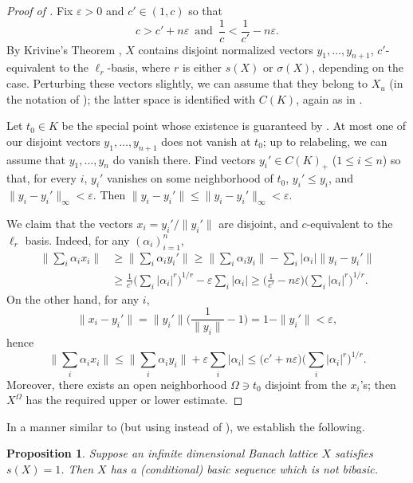 \documentclass[12pt,leqno]{amsart}
\newtheorem{proposition}[theorem]{Proposition}
\numberwithin{equation}{section}
\theoremstyle{definition}
\def\vp{\varepsilon}
\begin{document}
\begin{proof}[Proof of ]
Fix $\vp > 0$ and $c' \in (1,c)$ so that
$$
c > c' + n \vp \, {\textrm{  and  }} \, \frac1c < \frac1{c'} - n \vp .
$$
By Krivine's Theorem \cite{Schep}, $X$ contains disjoint normalized vectors $y_1, \ldots, y_{n+1}$, $c'$-equivalent to the $\ell_r$-basis, where $r$ is either $s(X)$ or $\sigma(X)$, depending on the case.
Perturbing these vectors slightly, we can assume that they belong to $X_u$ (in the notation of ); the latter space is identified with $C(K)$, again as in .
\medskip

Let $t_0 \in K$ be the special point whose existence is guaranteed by . At most one of our disjoint vectors $y_1, \ldots, y_{n+1}$ does not vanish at $t_0$; up to relabeling, we can assume that $y_1, \ldots, y_n$ do vanish there.
Find vectors $y_i' \in C(K)_+$ ($1 \leq i \leq n$) so that, for every $i$, $y_i'$ vanishes on some neighborhood of $t_0$, $y_i' \leq y_i$, and $\|y_i - y_i'\|_\infty < \vp$. Then $\|y_i - y_i'\| \leq \|y_i - y_i'\|_\infty < \vp$. 
\medskip

We claim that the vectors $x_i = y_i'/\|y_i'\|$ are disjoint, and $c$-equivalent to the $\ell_r$ basis. Indeed, for any $(\alpha_i)_{i=1}^n$,
\begin{align*}
\big\| \sum_i \alpha_i x_i \big\| 
&
\geq \big\| \sum_i \alpha_i y_i' \big\| \geq  \big\| \sum_i \alpha_i y_i \big\| - \sum_i |\alpha_i| \|y_i - y_i'\|
\\
&
\geq \frac1{c'} \big( \sum_i |\alpha_i|^r \big)^{1/r} - \vp \sum_i |\alpha_i| \geq \Big( \frac1{c'} - n \vp \Big) \big( \sum_i |\alpha_i|^r \big)^{1/r} .
\end{align*}
On the other hand, for any $i$,
$$
\big\| x_i - y_i' \big\| = \|y_i'\| \Big( \frac1{\|y_i\|} - 1 \Big) = 1 - \|y_i'\| < \vp ,
$$
hence
$$
\big\| \sum_i \alpha_i x_i \big\| \leq \big\| \sum_i \alpha_i y_i \big\| + \vp \sum_i |\alpha_i| \leq \big(c' + n \vp \big) \big( \sum_i |\alpha_i|^r \big)^{1/r} .
$$
Moreover, there exists an open neighborhood $\Omega \ni t_0$ disjoint from the $x_i$'s; then $X^\Omega$ has the required upper or lower estimate.
\end{proof}

In a manner similar to  (but using  instead of ), we establish the following.

\begin{proposition}\label{p:cond_not_bibasic}
 Suppose an infinite dimensional Banach lattice $X$ satisfies $s(X) = 1$.
 Then $X$ has a (conditional) basic sequence which is not bibasic.
\end{proposition}
\end{document}
